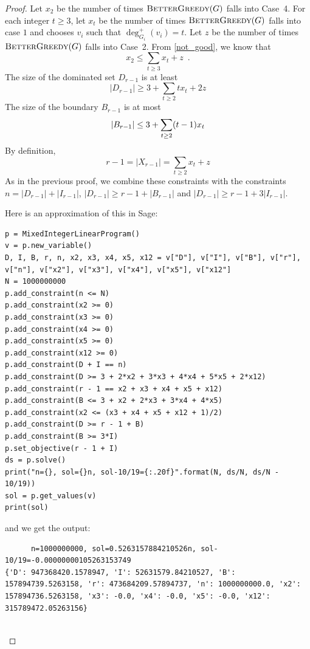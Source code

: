 \documentclass[12pt]{article}
\begin{document}
\begin{proof}
  Let $x_2$ be the number of times $\textsc{BetterGreedy}(G)$ falls into Case~4.
  For each integer $t\ge 3$, let $x_t$ be the number of times $\textsc{BetterGreedy}(G)$ falls into case $1$ and chooses $v_i$ such that $\deg^+_{G_i}(v_i)=t$.  Let $z$ be the number of times $\textsc{BetterGreedy}(G)$ falls into Case~2.  From \cref{not_good}, we know that
  \begin{equation}
      x_2 \le \sum_{t\ge 3}x_t + z \enspace .
  \end{equation}
  The size of the dominated set $D_{r-1}$ is at least
  \[
    |D_{r-1}| \ge 3 + \sum_{t\ge 2}tx_t + 2z
  \]
  The size of the boundary $B_{r-1}$ is at most
  \begin{equation}
       |B_{r-1}| \le 3 + \sum_{t\ge 2} (t-1)x_t \\
  \end{equation}
  By definition,
  \[
     r-1 = |X_{r-1}| = \sum_{t\ge 2} x_t + z
  \]
  As in the previous proof, we combine these constraints with the constraints $n=|D_{r-1}|+|I_{r-1}|$,  $|D_{r-1}|\ge r-1+|B_{r-1}|$ and $|D_{r-1}|\ge r-1+3|I_{r-1}|$.

  Here is an approximation of this in Sage:
  \begin{verbatim}
p = MixedIntegerLinearProgram()
v = p.new_variable()
D, I, B, r, n, x2, x3, x4, x5, x12 = v["D"], v["I"], v["B"], v["r"], v["n"], v["x2"], v["x3"], v["x4"], v["x5"], v["x12"]
N = 1000000000
p.add_constraint(n <= N)
p.add_constraint(x2 >= 0)
p.add_constraint(x3 >= 0)
p.add_constraint(x4 >= 0)
p.add_constraint(x5 >= 0)
p.add_constraint(x12 >= 0)
p.add_constraint(D + I == n)
p.add_constraint(D >= 3 + 2*x2 + 3*x3 + 4*x4 + 5*x5 + 2*x12)
p.add_constraint(r - 1 == x2 + x3 + x4 + x5 + x12)
p.add_constraint(B <= 3 + x2 + 2*x3 + 3*x4 + 4*x5)
p.add_constraint(x2 <= (x3 + x4 + x5 + x12 + 1)/2)
p.add_constraint(D >= r - 1 + B)
p.add_constraint(B >= 3*I)
p.set_objective(r - 1 + I)
ds = p.solve()
print("n={}, sol={}n, sol-10/19={:.20f}".format(N, ds/N, ds/N - 10/19))
sol = p.get_values(v)
print(sol)
  \end{verbatim}
  and we get the output:
  \begin{verbatim}
      n=1000000000, sol=0.5263157884210526n, sol-10/19=-0.00000000105263153749
{'D': 947368420.1578947, 'I': 52631579.84210527, 'B': 157894739.5263158, 'r': 473684209.57894737, 'n': 1000000000.0, 'x2': 157894736.5263158, 'x3': -0.0, 'x4': -0.0, 'x5': -0.0, 'x12': 315789472.05263156}


\end{verbatim}
\end{proof}
\end{document}
